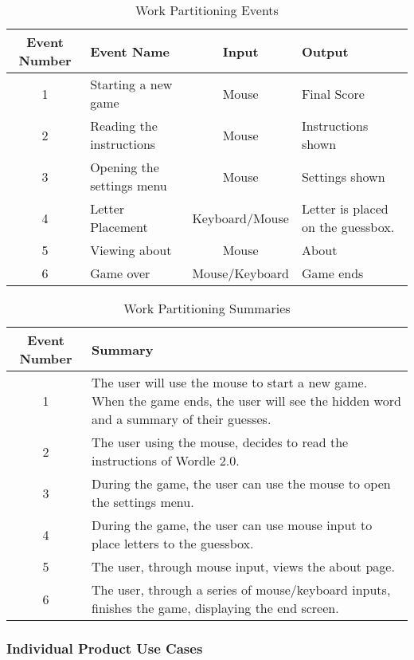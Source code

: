\documentclass[12pt, titlepage]{article}
\begin{document}
\begin{table}[h!]
	\caption{Work Partitioning Events}
	\centering
	\begin{tabular}{|c|p{3.5cm}|c|p{3.5cm}|}
		\hline
		\textbf{Event Number} & \centering\textbf{Event Name} & \textbf{Input} 
		& \textbf{Output} \\
		\hline
		1 & Starting a new game & Mouse & Final Score \\
		\hline
		2 & Reading the instructions & Mouse & Instructions shown \\
		\hline
		3 & Opening the settings menu & Mouse & Settings shown \\
		\hline
		4 & Letter Placement & Keyboard/Mouse & Letter is placed on the 
		guessbox. \\
		\hline
		5 & Viewing about & Mouse & About \\
		\hline
		6 & Game over & Mouse/Keyboard & Game ends \\
		\hline
	\end{tabular}
\end{table}
\begin{table}[h]
	\caption{Work Partitioning Summaries}
	\centering
	\begin{tabular}{|c|p{11cm}|}
		\hline
		\textbf{Event Number} & \textbf{Summary} \\
		\hline
		1 & The user will use the mouse to start a 
		new game. When the game ends, the user will see the hidden word 
		and a summary of their guesses. \\
		\hline
		2 & The user using the mouse, decides to read the instructions of 
		Wordle 2.0. \\
		\hline
		3 & During the game, the user can use the mouse to open the settings 
		menu. \\
		\hline
		4 & During the game, the user can use mouse input to place letters to 
		the guessbox. \\
		\hline
		5 &  The user, through mouse input, views the about page.\\
		\hline
		6 & The user, through a series of mouse/keyboard inputs, finishes the 
		game, displaying the end screen. \\
		\hline
	\end{tabular}
\end{table}




\subsubsection{Individual Product Use Cases}
\end{document}
